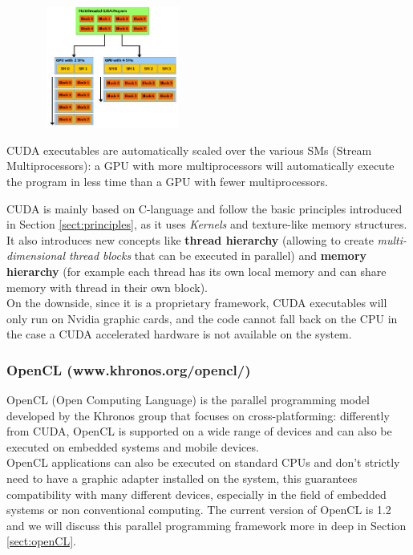 \begin{figurehere}
 \centering
 \includegraphics[width=7cm, height=4cm]{./eps/scalability.eps}
 \caption{CUDA executables are automatically scaled over the various SMs (Stream Multiprocessors): a GPU with more multiprocessors will automatically execute the program in less time than a GPU with fewer multiprocessors.}
 \label{fig:scalability}
\end{figurehere}

CUDA is mainly based on C-language and follow the basic principles introduced in Section \ref{sect:principles}, as it uses \textit{Kernels} and texture-like memory structures. It also introduces new concepts like \textbf{thread hierarchy} (allowing to create \textit{multi-dimensional thread blocks} that can be executed in parallel) and \textbf{memory hierarchy} (for example each thread has its own local memory and can share memory with thread in their own block).\\
On the downside, since it is a proprietary framework, CUDA executables will only run on Nvidia graphic cards, and the code cannot fall back on the CPU in the case a CUDA accelerated hardware is not available on the system.\cite{siroro:GPUComparison}

\subsubsection{OpenCL (www.khronos.org/opencl/)}
OpenCL (Open Computing Language) is the parallel programming model developed by the Khronos group that focuses on cross-platforming: differently from CUDA, OpenCL is supported on a wide range of devices and can also be executed on embedded systems and mobile devices.\\
OpenCL applications can also be executed on standard CPUs and don't strictly need to have a graphic adapter installed on the system, this guarantees compatibility with many different devices, especially in the field of embedded systems or non conventional computing.
The current version of OpenCL is 1.2 and we will discuss this parallel programming framework more in deep in Section \ref{sect:openCL}.

